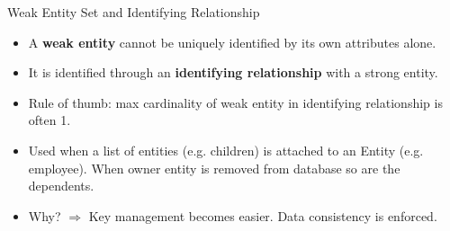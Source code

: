 \documentclass[10pt,aspectratio=169]{beamer}
\newcommand{\keyattr}[1]{\underline{#1}}
\begin{document}
\begin{frame}{Weak Entity Set and Identifying Relationship}
\begin{itemize}
  \item A \textbf{weak entity} cannot be uniquely identified by its own attributes alone.
  \item It is identified through an \textbf{identifying relationship} with a strong entity.
  \item Rule of thumb: max cardinality of weak entity in identifying relationship is often 1.
\end{itemize}

\centering
{}
\begin{itemize}
    \item Used when a list of entities (e.g. children) is attached to an Entity (e.g. employee). When owner entity is removed from database so are the dependents. 
    \item Why? $\Rightarrow$ Key management becomes easier. Data consistency is enforced. 
\end{itemize}
\end{frame}
\end{document}
